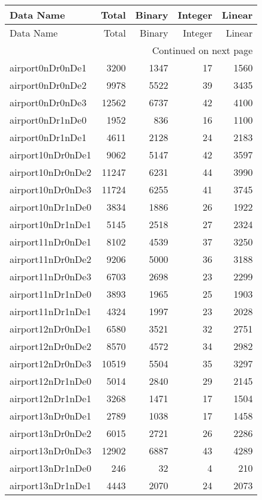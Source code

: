 
\begin{longtable}{lrrrr}
\toprule
Data Name & Total & Binary & Integer & Linear \\
\midrule
\endfirsthead
\toprule
Data Name & Total & Binary & Integer & Linear \\
\midrule
\endhead
\midrule
\multicolumn{5}{r}{Continued on next page} \\
\midrule
\endfoot
\bottomrule
\endlastfoot
airport0nDr0nDe1 & 3200 & 1347 & 17 & 1560 \\
airport0nDr0nDe2 & 9978 & 5522 & 39 & 3435 \\
airport0nDr0nDe3 & 12562 & 6737 & 42 & 4100 \\
airport0nDr1nDe0 & 1952 & 836 & 16 & 1100 \\
airport0nDr1nDe1 & 4611 & 2128 & 24 & 2183 \\
airport10nDr0nDe1 & 9062 & 5147 & 42 & 3597 \\
airport10nDr0nDe2 & 11247 & 6231 & 44 & 3990 \\
airport10nDr0nDe3 & 11724 & 6255 & 41 & 3745 \\
airport10nDr1nDe0 & 3834 & 1886 & 26 & 1922 \\
airport10nDr1nDe1 & 5145 & 2518 & 27 & 2324 \\
airport11nDr0nDe1 & 8102 & 4539 & 37 & 3250 \\
airport11nDr0nDe2 & 9206 & 5000 & 36 & 3188 \\
airport11nDr0nDe3 & 6703 & 2698 & 23 & 2299 \\
airport11nDr1nDe0 & 3893 & 1965 & 25 & 1903 \\
airport11nDr1nDe1 & 4324 & 1997 & 23 & 2028 \\
airport12nDr0nDe1 & 6580 & 3521 & 32 & 2751 \\
airport12nDr0nDe2 & 8570 & 4572 & 34 & 2982 \\
airport12nDr0nDe3 & 10519 & 5504 & 35 & 3297 \\
airport12nDr1nDe0 & 5014 & 2840 & 29 & 2145 \\
airport12nDr1nDe1 & 3268 & 1471 & 17 & 1504 \\
airport13nDr0nDe1 & 2789 & 1038 & 17 & 1458 \\
airport13nDr0nDe2 & 6015 & 2721 & 26 & 2286 \\
airport13nDr0nDe3 & 12902 & 6887 & 43 & 4289 \\
airport13nDr1nDe0 & 246 & 32 & 4 & 210 \\
airport13nDr1nDe1 & 4443 & 2070 & 24 & 2073 \\

\end{longtable}
